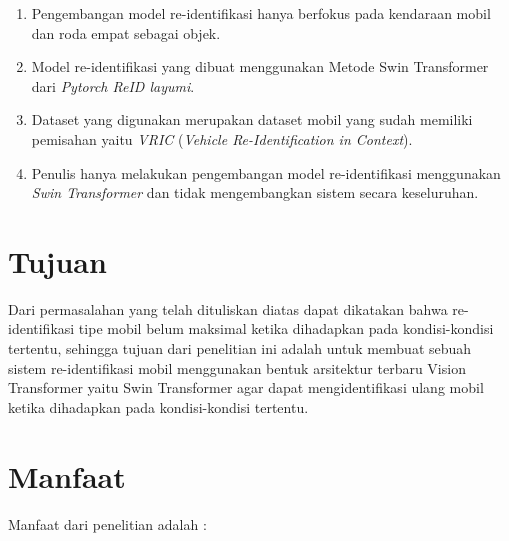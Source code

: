 \begin{enumerate}[nolistsep]

      \item Pengembangan model re-identifikasi hanya berfokus pada kendaraan mobil dan roda empat sebagai objek.

      \item Model re-identifikasi yang dibuat menggunakan Metode Swin Transformer dari \emph{Pytorch 
      ReID layumi}.

      \item Dataset yang digunakan merupakan dataset mobil yang sudah memiliki pemisahan yaitu \emph{VRIC}
      (\emph{Vehicle Re-Identification in Context}).

      \item Penulis hanya melakukan pengembangan model re-identifikasi menggunakan \emph{Swin Transformer} dan tidak 
      mengembangkan sistem secara keseluruhan.

\end{enumerate}

\section{Tujuan}
\label{sec:Tujuan}

Dari permasalahan yang telah dituliskan diatas dapat dikatakan bahwa re-identifikasi tipe mobil belum maksimal
ketika dihadapkan pada kondisi-kondisi tertentu, sehingga tujuan dari penelitian ini adalah untuk membuat
sebuah sistem re-identifikasi mobil menggunakan bentuk arsitektur terbaru Vision Transformer yaitu 
Swin Transformer agar dapat mengidentifikasi ulang mobil ketika dihadapkan pada kondisi-kondisi tertentu.


\section{Manfaat}
\label{sec:manfaat}

Manfaat dari penelitian adalah :

